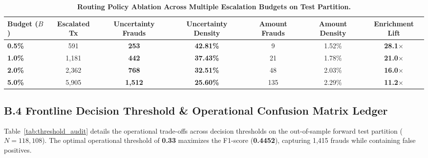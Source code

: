 \documentclass[10pt,a4paper]{article}
\begin{document}
\vspace{-2pt}
\begin{table}[h!]
\centering
\scriptsize
\renewcommand{\arraystretch}{0.76}
\caption{\textbf{Routing Policy Ablation Across Multiple Escalation Budgets on Test Partition.}}
\label{tab:ablation}
\vspace{1pt}
\begin{tabularx}{\linewidth}{@{}lcccccc@{}}
\toprule
\textbf{Budget ($B$)} & \textbf{Escalated Tx} & \textbf{Uncertainty Frauds} & \textbf{Uncertainty Density} & \textbf{Amount Frauds} & \textbf{Amount Density} & \textbf{Enrichment Lift} \\
\midrule
\textbf{0.5\%} & 591 & \textbf{253} & \textbf{42.81\%} & 9 & 1.52\% & \textbf{28.1$\times$} \\
\textbf{1.0\%} & 1,181 & \textbf{442} & \textbf{37.43\%} & 21 & 1.78\% & \textbf{21.0$\times$} \\
\textbf{2.0\%} & 2,362 & \textbf{768} & \textbf{32.51\%} & 48 & 2.03\% & \textbf{16.0$\times$} \\
\textbf{5.0\%} & 5,905 & \textbf{1,512} & \textbf{25.60\%} & 135 & 2.29\% & \textbf{11.2$\times$} \\
\bottomrule
\end{tabularx}
\end{table}
\vspace{-5pt}

\subsection*{B.4 Frontline Decision Threshold \& Operational Confusion Matrix Ledger}
Table~\ref{tab:threshold_audit} details the operational trade-offs across decision thresholds on the out-of-sample forward test partition ($N=118,108$). The optimal operational threshold of \textbf{0.33} maximizes the F1-score (\textbf{0.4452}), capturing 1,415 frauds while containing false positives.
\end{document}

